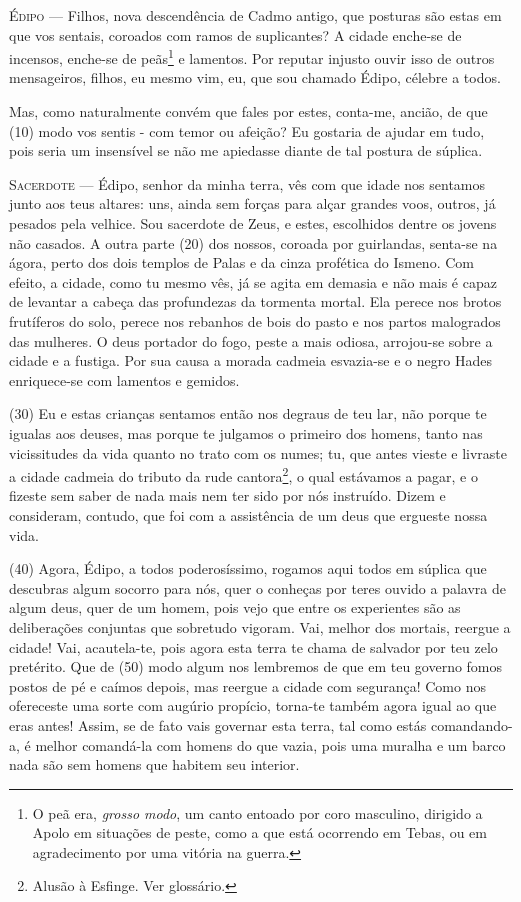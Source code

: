 \textsc{Édipo} --- Filhos, nova descendência de Cadmo antigo, que posturas são estas em que
vos sentais, coroados com ramos de suplicantes? A cidade enche-se de
incensos, enche-se de peãs\footnote{O peã era, \emph{grosso modo}, um 
canto entoado por coro masculino, dirigido a Apolo em situações de 
peste, como a que está ocorrendo em Tebas, ou em agradecimento por uma 
vitória na guerra.} e lamentos. Por reputar injusto ouvir isso de 
outros mensageiros, filhos, eu mesmo vim, eu, que sou chamado Édipo, 
célebre a todos.

Mas, como naturalmente convém que fales por estes, conta-me, ancião, de
que (10) modo vos sentis - com temor ou afeição? Eu gostaria de ajudar
em tudo, pois seria um insensível se não me apiedasse diante de tal
postura de súplica.

\textsc{Sacerdote} --- Édipo, senhor da minha terra, vês com que idade nos sentamos junto aos
teus altares: uns, ainda sem forças para alçar grandes voos, outros, já
pesados pela velhice. Sou sacerdote de Zeus, e estes, escolhidos dentre
os jovens não casados. A outra parte (20) dos nossos, coroada por
guirlandas, senta-se na ágora, perto dos dois templos de Palas e da
cinza profética do Ismeno. Com efeito, a cidade, como tu mesmo vês, já
se agita em demasia e não mais é capaz de levantar a cabeça das
profundezas da tormenta mortal. Ela perece nos brotos frutíferos do
solo, perece nos rebanhos de bois do pasto e nos partos malogrados das
mulheres. O deus portador do fogo, peste a mais odiosa, arrojou-se sobre
a cidade e a fustiga. Por sua causa a morada cadmeia esvazia-se e o
negro Hades enriquece-se com lamentos e gemidos.

(30) Eu e estas crianças sentamos então nos degraus de teu lar, não
porque te igualas aos deuses, mas porque te julgamos o primeiro dos
homens, tanto nas vicissitudes da vida quanto no trato com os numes; tu,
que antes vieste e livraste a cidade cadmeia do tributo da rude
cantora\footnote{Alusão à Esfinge. Ver glossário.}, o qual estávamos a
pagar, e o fizeste sem saber de nada mais nem ter sido por nós
instruído. Dizem e consideram, contudo, que foi com a assistência de um
deus que ergueste nossa vida.

(40) Agora, Édipo, a todos poderosíssimo, rogamos aqui todos em súplica
que descubras algum socorro para nós, quer o conheças por teres ouvido a
palavra de algum deus, quer de um homem, pois vejo que entre os
experientes são as deliberações conjuntas que sobretudo vigoram. Vai,
melhor dos mortais, reergue a cidade! Vai, acautela-te, pois agora esta
terra te chama de salvador por teu zelo pretérito. Que de (50) modo
algum nos lembremos de que em teu governo fomos postos de pé e caímos
depois, mas reergue a cidade com segurança! Como nos ofereceste uma
sorte com augúrio propício, torna-te também agora igual ao que eras
antes! Assim, se de fato vais governar esta terra, tal como estás
comandando-a, é melhor comandá-la com homens do que vazia, pois uma
muralha e um barco nada são sem homens que habitem seu interior.

